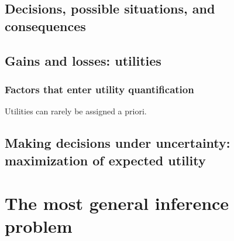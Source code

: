 \documentclass[
  a4paper,
  DIV=11,
  numbers=noendperiod,
  oneside]{scrreprt}
\begin{document}
\hypertarget{decisions-possible-situations-and-consequences}{%
\section{Decisions, possible situations, and
consequences}\label{decisions-possible-situations-and-consequences}}

\hypertarget{gains-and-losses-utilities}{%
\section{Gains and losses: utilities}\label{gains-and-losses-utilities}}

\hypertarget{factors-that-enter-utility-quantification}{%
\subsection{Factors that enter utility
quantification}\label{factors-that-enter-utility-quantification}}

Utilities can rarely be assigned a priori.

\hypertarget{making-decisions-under-uncertainty-maximization-of-expected-utility}{%
\section{Making decisions under uncertainty: maximization of expected
utility}\label{making-decisions-under-uncertainty-maximization-of-expected-utility}}


\hypertarget{the-most-general-inference-problem}{%
\chapter{The most general inference
problem}\label{the-most-general-inference-problem}}
\end{document}
